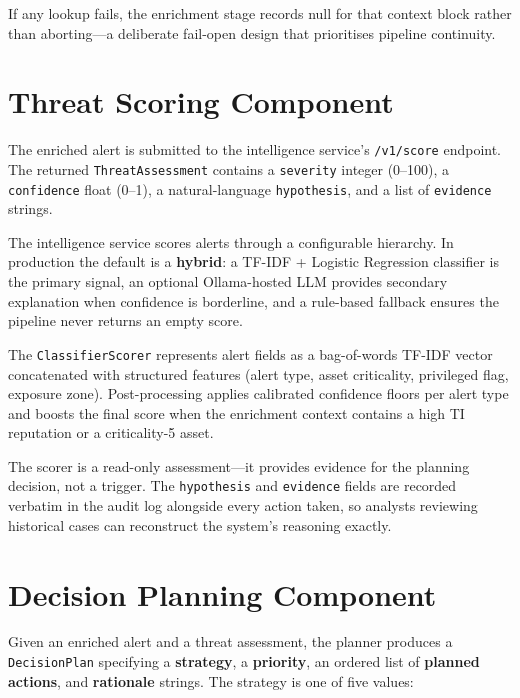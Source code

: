 If any lookup fails, the enrichment stage records null for that context block rather
than aborting---a deliberate fail-open design that prioritises pipeline continuity.

\section{Threat Scoring Component}

The enriched alert is submitted to the intelligence service's \texttt{/v1/score}
endpoint. The returned \texttt{ThreatAssessment} contains a \texttt{severity} integer
(0--100), a \texttt{confidence} float (0--1), a natural-language \texttt{hypothesis},
and a list of \texttt{evidence} strings.

The intelligence service scores alerts through a configurable hierarchy. In production
the default is a \textbf{hybrid}: a TF-IDF + Logistic Regression classifier is the
primary signal, an optional Ollama-hosted LLM provides secondary explanation when
confidence is borderline, and a rule-based fallback ensures the pipeline never returns
an empty score.

The \texttt{ClassifierScorer} represents alert fields as a bag-of-words TF-IDF vector
concatenated with structured features (alert type, asset criticality, privileged flag,
exposure zone). Post-processing applies calibrated confidence floors per alert type and
boosts the final score when the enrichment context contains a high TI reputation or a
criticality-5 asset.

The scorer is a read-only assessment---it provides evidence for the planning decision,
not a trigger. The \texttt{hypothesis} and \texttt{evidence} fields are recorded verbatim
in the audit log alongside every action taken, so analysts reviewing historical cases
can reconstruct the system's reasoning exactly.

\section{Decision Planning Component}

Given an enriched alert and a threat assessment, the planner produces a
\texttt{DecisionPlan} specifying a \textbf{strategy}, a \textbf{priority}, an ordered
list of \textbf{planned actions}, and \textbf{rationale} strings. The strategy is one
of five values:

